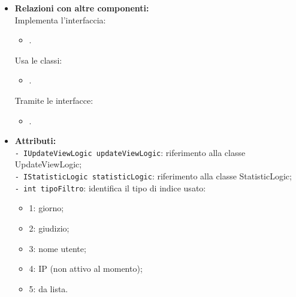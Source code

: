 {\begin{sloppypar}
{\begin{itemize}
\begin{itemize}
				\item[]  \textbf{Relazioni con altre componenti:} \\
				Implementa l'interfaccia:
				\begin{itemize}
					\item {}.
				\end{itemize}
				Usa le classi:
				\begin{itemize}
					\item {}.
				\end{itemize}
				Tramite le interfacce:
				\begin{itemize}
					\item {}.
				\end{itemize}
					
				\item[] \textbf{Attributi:}\\
					\texttt{- IUpdateViewLogic updateViewLogic}: riferimento alla classe UpdateViewLogic;\\
					\texttt{- IStatisticLogic statisticLogic}: riferimento alla classe StatisticLogic;\\
					\texttt{- int tipoFiltro}: identifica il tipo di indice usato:
					\begin{itemize}
						\item 1: giorno;
						\item 2: giudizio;
						\item 3: nome utente;
						\item 4: IP (non attivo al momento);
						\item 5: da lista. 
					\end{itemize}


\end{itemize}
\end{itemize}}
\end{sloppypar}}
